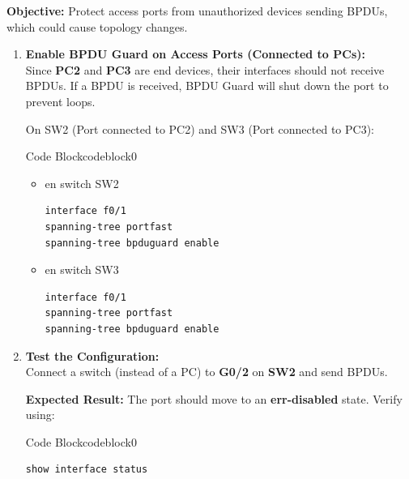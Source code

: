 \documentclass[a4paper]{book}
\begin{document}
\textbf{Objective:} Protect access ports from unauthorized devices sending BPDUs, which could cause topology changes.

\begin{enumerate}
	\item \textbf{Enable BPDU Guard on Access Ports (Connected to PCs):} \\
	      Since \textbf{PC2} and \textbf{PC3} are end devices, their interfaces should not receive BPDUs. If a BPDU is received, BPDU Guard will shut down the port to prevent loops.

	      On SW2 (Port connected to PC2) and SW3 (Port connected to PC3):




	      \begin{ocg}{Code Block}{codeblock}{0}
		      \vspace{0.5cm}
		      \begin{itemize}
			      \item en switch SW2
			            \begin{lstlisting}
interface f0/1
spanning-tree portfast
spanning-tree bpduguard enable
                \end{lstlisting}
			      \item en switch SW3
			            \begin{lstlisting}
interface f0/1
spanning-tree portfast
spanning-tree bpduguard enable
                \end{lstlisting}
		      \end{itemize}
	      \end{ocg}


	\item \textbf{Test the Configuration:} \\
	      Connect a switch (instead of a PC) to \textbf{G0/2} on \textbf{SW2} and send BPDUs.

	      \textbf{Expected Result:} The port should move to an \textbf{err-disabled} state. Verify using:


	      \begin{ocg}{Code Block}{codeblock}{0}
		      \vspace{0.5cm}
		      \begin{lstlisting}
show interface status
                \end{lstlisting}
	      \end{ocg}


\end{enumerate}
\end{document}
